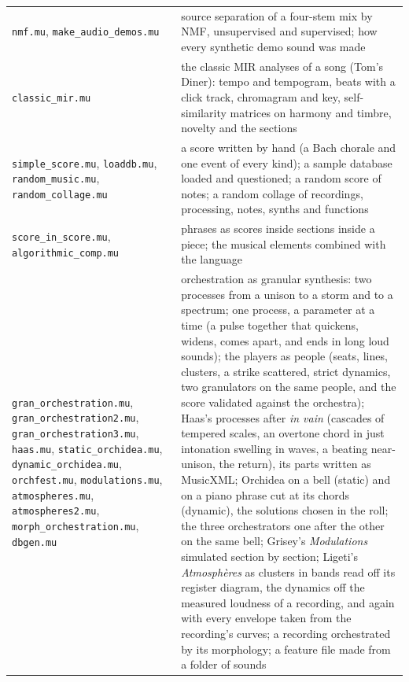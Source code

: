 \documentclass[11pt,a4paper]{article}
\begin{document}
\begin{center}
\begin{tabular}{@{}ll@{}}
\texttt{nmf.mu}, \texttt{make\_audio\_demos.mu} & source separation of a four-stem mix by NMF, unsupervised and supervised; how every synthetic demo sound was made \\
\texttt{classic\_mir.mu} & the classic MIR analyses of a song (Tom's Diner): tempo and tempogram, beats with a click track, chromagram and key, self-similarity matrices on harmony and timbre, novelty and the sections \\
\texttt{simple\_score.mu}, \texttt{loaddb.mu}, \texttt{random\_music.mu}, \texttt{random\_collage.mu} & a score written by hand (a Bach chorale and one event of every kind); a sample database loaded and questioned; a random score of notes; a random collage of recordings, processing, notes, synths and functions \\
\texttt{score\_in\_score.mu}, \texttt{algorithmic\_comp.mu} & phrases as scores inside sections inside a piece; the musical elements combined with the language \\
\texttt{gran\_orchestration.mu}, \texttt{gran\_orchestration2.mu}, \texttt{gran\_orchestration3.mu}, \texttt{haas.mu}, \texttt{static\_orchidea.mu}, \texttt{dynamic\_orchidea.mu}, \texttt{orchfest.mu}, \texttt{modulations.mu}, \texttt{atmospheres.mu}, \texttt{atmospheres2.mu}, \texttt{morph\_orchestration.mu}, \texttt{dbgen.mu} & orchestration as granular synthesis: two processes from a unison to a storm and to a spectrum; one process, a parameter at a time (a pulse together that quickens, widens, comes apart, and ends in long loud sounds); the players as people (seats, lines, clusters, a strike scattered, strict dynamics, two granulators on the same people, and the score validated against the orchestra); Haas's processes after \emph{in vain} (cascades of tempered scales, an overtone chord in just intonation swelling in waves, a beating near-unison, the return), its parts written as MusicXML; Orchidea on a bell (static) and on a piano phrase cut at its chords (dynamic), the solutions chosen in the roll; the three orchestrators one after the other on the same bell; Grisey's \emph{Modulations} simulated section by section; Ligeti's \emph{Atmosphères} as clusters in bands read off its register diagram, the dynamics off the measured loudness of a recording, and again with every envelope taken from the recording's curves; a recording orchestrated by its morphology; a feature file made from a folder of sounds \\
\bottomrule
\end{tabular}
\end{center}
\end{document}
